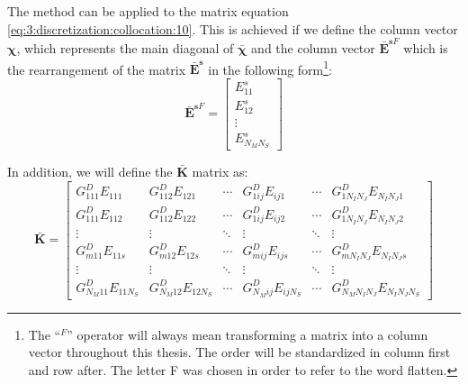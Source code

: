 			The method can be applied to the matrix equation \eqref{eq:3:discretization:collocation:10}. This is achieved if we define the column vector $\boldsymbol{\chi}$, which represents the main diagonal of $\boldsymbol{\bar{\chi}}$ and the column vector $\mathbf{\bar{E}}^{\mathbf{s}F}$ which is the rearrangement of the matrix $\mathbf{\bar{E}^s}$ in the following form\footnote{The ``$^F$'' operator will always mean transforming a matrix into a column vector throughout this thesis. The order will be standardized in column first and row after. The letter F was chosen in order to refer to the word flatten.}:
			\begin{equation}
				\mathbf{\bar{E}}^{\mathbf{s}F} =     \begin{bmatrix}
																			E^s_{11} \\ E^s_{12} \\ \vdots \\ E^s_{N_MN_S}
																		\end{bmatrix} \label{eq:3:columnvector}
			\end{equation}
			
			In addition, we will define the $\mathbf{\bar{K}}$ matrix as:
			\begin{equation}
				\mathbf{\bar{K}} = \begin{bmatrix}
											 G^D_{111}E_{111} & G^D_{112}E_{121} & \cdots & G^D_{1ij}E_{ij1} & \cdots & G^D_{1N_IN_J}E_{N_IN_J1} \\
											 G^D_{111}E_{112} & G^D_{112}E_{122} & \cdots & G^D_{1ij}E_{ij2} & \cdots & G^D_{1N_IN_J}E_{N_IN_J2} \\
											 \vdots & \vdots & \ddots & \vdots & \ddots & \vdots \\
											 G^D_{m11}E_{11s} & G^D_{m12}E_{12s} & \cdots & G^D_{mij}E_{ijs} & \cdots & G^D_{mN_IN_J}E_{N_IN_Js} \\
											 \vdots & \vdots & \ddots & \vdots & \ddots & \vdots \\
											 G^D_{N_M11}E_{11N_S} & G^D_{N_M12}E_{12N_S} & \cdots & G^D_{N_Mij}E_{ijN_S} & \cdots & G^D_{N_MN_IN_J}E_{N_IN_JN_S}
										 \end{bmatrix} \label{eq:3:discretization:Kmatrix}
			\end{equation}
		

